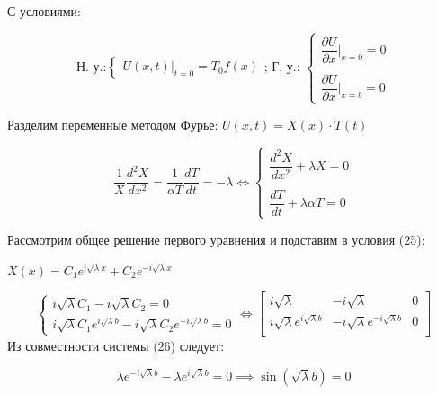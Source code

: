 \documentclass[a4paper, 12pt]{article}
\begin{document}
	\quad С условиями: 
	
	\begin{equation}
		\text{Н. у.:} \begin{cases}
			U(x, t)\bigg|_{t = 0} = T_0 f(x)
		\end{cases}\text{; Г. у.: }\begin{cases}
			\dfrac{\partial U}{\partial x} \bigg|_{x = 0} = 0\\
			\\
			\dfrac{\partial U}{\partial x} \bigg|_{x = b} = 0
		\end{cases}
	\end{equation}
	
	\quad Разделим переменные методом Фурье: $U(x, t) = X(x) \cdot T(t)$ 
	
	\begin{equation}
		 \dfrac{1}{X} \dfrac{d^2X}{dx^2} = \dfrac{1}{\alpha T}\dfrac{dT}{dt} = -\lambda \Leftrightarrow
			\begin{cases}
			\dfrac{d^2 X}{dx^2} +\lambda X = 0 \\
			\\
			\dfrac{dT}{dt} +\lambda\alpha T = 0
		\end{cases}
	\end{equation}
	
	\quad Рассмотрим общее решение первого уравнения и подставим в условия (25): 
	
	\begin{center}
		$X(x) = C_1 e^{i\sqrt{\lambda} x} + C_2 e^{-i\sqrt{\lambda} x}$
	\end{center}
	
	\begin{equation}
		\begin{cases}
			i\sqrt{\lambda}C_1 - i\sqrt{\lambda} C_2 = 0 \\
			i\sqrt{\lambda}C_1 e^{i\sqrt{\lambda} b} - i\sqrt{\lambda}C_2e^{-i\sqrt{\lambda}b} = 0
		\end{cases} \Leftrightarrow \left[\begin{array}{cc|c}
			i\sqrt{\lambda} & -i\sqrt{\lambda} & 0 \\
			i\sqrt{\lambda}e^{i\sqrt{\lambda} b} & -i\sqrt{\lambda}e^{-i\sqrt{\lambda}b} & 0 \\
		\end{array}\right]
	\end{equation}
	\label{key}
	\quad Из совместности системы (26) следует: 
	
	\begin{equation}
		\lambda e^{-i\sqrt{\lambda} b} - \lambda e^{i\sqrt{\lambda}b} = 0 \implies \sin\left(\sqrt{\lambda} b\right) = 0
	\end{equation}
	
\end{document}
